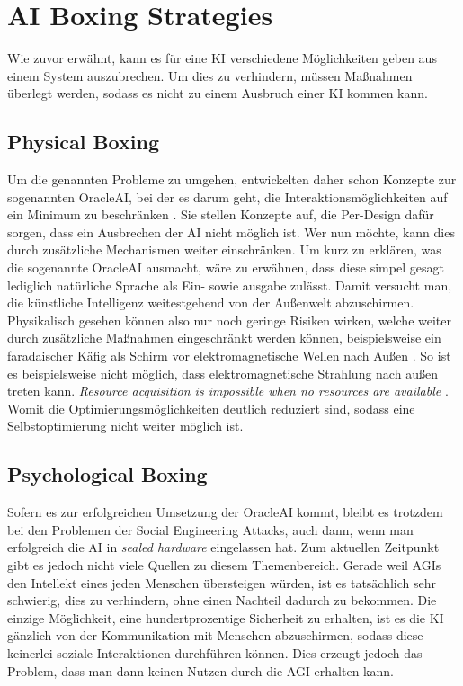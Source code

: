     \section{AI Boxing Strategies}
        Wie zuvor erwähnt, kann es für eine KI verschiedene Möglichkeiten geben aus einem System auszubrechen. Um dies
        zu verhindern, müssen Maßnahmen überlegt werden, sodass es nicht zu einem Ausbruch einer KI kommen kann.

        \subsection{Physical Boxing}

        Um die genannten Probleme zu umgehen, entwickelten daher schon \citeauthor{armstrongforthcoming} Konzepte zur
        sogenannten OracleAI, bei der es darum geht, die Interaktionsmöglichkeiten auf ein Minimum zu beschränken
        \cite{armstrongforthcoming}. Sie stellen Konzepte auf, die Per-Design dafür sorgen, dass ein Ausbrechen der AI
        nicht möglich ist. Wer nun möchte, kann dies durch zusätzliche Mechanismen weiter einschränken. Um kurz zu
        erklären, was die sogenannte OracleAI ausmacht, wäre zu erwähnen, dass diese simpel gesagt lediglich natürliche
        Sprache als Ein- sowie ausgabe zulässt. Damit versucht man, die künstliche Intelligenz weitestgehend von der
        Außenwelt abzuschirmen. Physikalisch gesehen können also nur noch geringe Risiken wirken, welche weiter durch
        zusätzliche Maßnahmen eingeschränkt werden können, beispielsweise ein faradaischer Käfig als Schirm vor
        elektromagnetische Wellen nach Außen \cite[s. 308]{armstrongforthcoming}. So ist es beispielsweise nicht möglich,
        dass elektromagnetische Strahlung nach außen treten kann.
        \textit{Resource acquisition is impossible when no resources are available} \cite[s. 4]{ebhardt2018threat}.
        Womit die Optimierungsmöglichkeiten deutlich reduziert sind, sodass eine Selbstoptimierung nicht weiter möglich ist.

        \subsection{Psychological Boxing}

        Sofern es zur erfolgreichen Umsetzung der OracleAI kommt, bleibt es trotzdem bei den Problemen der Social
        Engineering Attacks, auch dann, wenn man erfolgreich die AI in \textit{sealed hardware} eingelassen hat.\cite[s. 4]{ebhardt2018threat}
        Zum aktuellen Zeitpunkt gibt es jedoch nicht viele Quellen zu diesem Themenbereich. Gerade weil AGIs den Intellekt
        eines jeden Menschen übersteigen würden, ist es tatsächlich sehr schwierig, dies zu verhindern, ohne einen Nachteil
        dadurch zu bekommen.\cite[s. 204]{yampolskiy2012leakproofing} Die einzige Möglichkeit, eine hundertprozentige Sicherheit
        zu erhalten, ist es die KI gänzlich von der Kommunikation mit Menschen abzuschirmen, sodass diese keinerlei
        soziale Interaktionen durchführen können. Dies erzeugt jedoch das Problem, dass man dann keinen Nutzen durch
        die AGI erhalten kann.

